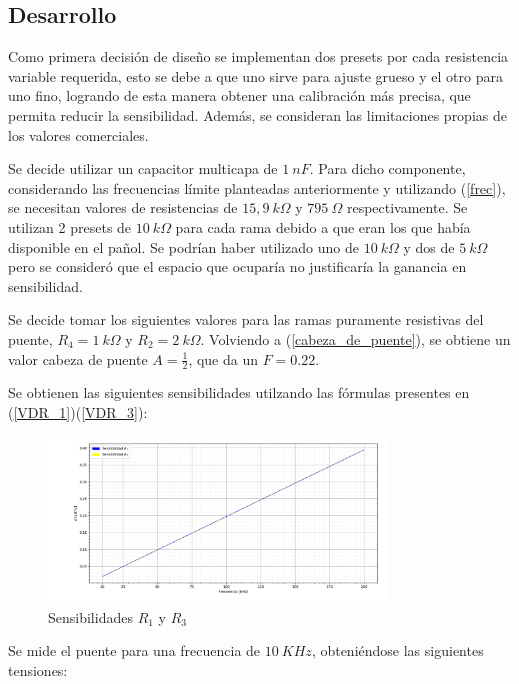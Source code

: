 \subsection{Desarrollo}

Como primera decisión de diseño se implementan dos presets por cada resistencia variable requerida, esto se debe a que uno sirve para ajuste grueso y el otro para uno fino, logrando de esta manera obtener una calibración más precisa, que permita reducir la sensibilidad. Además, se consideran las limitaciones propias de los valores comerciales.

Se decide utilizar un capacitor multicapa de $1 \ nF$. Para dicho componente, considerando las frecuencias límite planteadas anteriormente y utilizando (\ref{frec}), se necesitan valores de resistencias de $15,9 \ k\Omega$ y $795 \ \Omega$ respectivamente. Se utilizan 2 presets de $10 \ k\Omega$ para cada rama debido a que eran los que había disponible en el pañol. Se podrían haber utilizado uno de $10 \ k\Omega$ y dos de $5 \ k\Omega$ pero se consideró que el espacio que ocuparía no justificaría la ganancia en sensibilidad.

Se decide tomar los siguientes valores para las ramas puramente resistivas del puente, $R_4= 1 \ k\Omega$ y $R_2= 2 \ k\Omega$. Volviendo a (\ref{cabeza_de_puente}), se obtiene un valor cabeza de puente $A=\frac{1}{2}$, que da un $F=0.22$.
\par 


Se obtienen las siguientes sensibilidades utilzando las fórmulas presentes en (\ref{VDR_1})(\ref{VDR_3}):

\begin{figure}[H]
\centering
\includegraphics[width=0.8\textwidth]{Graficos/Sensibilidad}
\caption{Sensibilidades $R_1$ y $R_3$}
\label{fig:Sensibilidades}
\end{figure}

Se mide el puente para una frecuencia de $10 \ KHz $, obteniéndose las siguientes tensiones:

